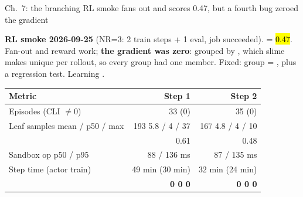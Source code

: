 \begin{frame}{Ch.\ 7: the branching RL smoke fans out and scores 0.47, but a fourth bug zeroed the gradient}
{\scriptsize\textbf{RL smoke 2026-09-25} (NR=3: 2 train steps + 1 eval, job succeeded).  = \hl{0.47}. Fan-out and reward work; \textbf{the gradient was zero}:  grouped by , which slime makes unique per rollout, so every group had one member. Fixed: group = , plus a regression test. Learning .\par}
\vspace{2mm}
\footnotesize
\begin{tabularx}{\textwidth}{@{}Y r r@{}}
\toprule
\textbf{Metric} & \textbf{Step 1} & \textbf{Step 2}\\
\midrule
Episodes (CLI $\neq$0) & 33 (0) & 35 (0)\\
Leaf samples \textperiodcentered{}  mean / p50 / max & 193 \textperiodcentered{} 5.8 / 4 / 37 & 167 \textperiodcentered{} 4.8 / 4 / 10\\
 & 0.61 & 0.48\\
Sandbox op p50 / p95 & 88 / 136 ms & 87 / 135 ms\\
Step time (actor train) & 49 min (30 min) & 32 min (24 min)\\
 \textperiodcentered{}  \textperiodcentered{}  & \textcolor{cat1}{\textbf{0 \textperiodcentered{} 0 \textperiodcentered{} 0}} & \textcolor{cat1}{\textbf{0 \textperiodcentered{} 0 \textperiodcentered{} 0}}\\
\bottomrule
\end{tabularx}
\end{frame}


